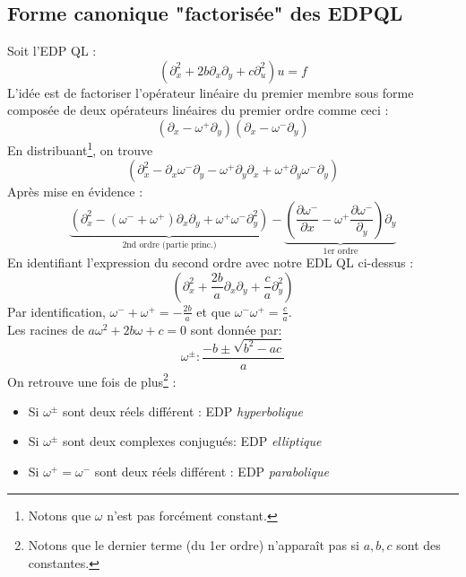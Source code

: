 \documentclass	[11pt, a4paper, openany]{book}
\begin{document}
\setcounter{subsection}{3}
\subsection{Forme canonique "factorisée" des EDPQL}
Soit l'EDP QL : 
\begin{equation}
(\partial^2_x + 2b\partial_x\partial_y + c \partial_u^2)u = f
\end{equation}
L'idée est de factoriser l'opérateur linéaire du premier membre sous forme composée de deux opérateurs linéaires du premier ordre comme ceci :
\begin{equation}
(\partial_x - \omega^+ \partial_y)(\partial_x - \omega^- \partial_y)
\end{equation}
En distribuant\footnote{Notons que $\omega$ n'est pas forcément constant.}, on trouve
\begin{equation}
(\partial_x^2 - \partial_x\omega^-\partial_y - \omega^+\partial_y\partial_x + \omega^+\partial_y\omega^-\partial_y)
\end{equation}
Après mise en évidence :
\begin{equation}
\underbrace{(\partial^2_x -(\omega^-+\omega^+)\partial_x\partial_y + \omega^+\omega^-\partial_y^2)}_{\text{2nd ordre (partie princ.)}} - \underbrace{\left(\frac{\partial \omega^-}{\partial x}-\omega^+\frac{\partial \omega^-}{\partial_y}\right)\partial_y}_{\text{1er ordre}}
\end{equation}
En identifiant l'expression du second ordre avec notre EDL QL ci-dessus :
\begin{equation}
(\partial_x^2 + \frac{2b}{a}\partial_x\partial_y + \frac{c}{a}\partial_y^2)
\end{equation}
Par identification, $\omega^-+\omega^+ = -\frac{2b}{a}$ et que $\omega^-\omega^+ = \frac{c}{a}$.\\
Les racines de $a\omega^2 +2b\omega + c = 0$ sont donnée par:
\begin{equation}
\omega^\pm : \dfrac{-b\pm \sqrt{b^2-ac}}{a}
\end{equation}
On retrouve une fois de plus\footnote{Notons que le dernier terme (du 1er ordre) n'apparaît pas si $a,b,c$ sont des constantes.} : 
\begin{itemize}
\item Si $\omega^\pm$ sont deux réels différent : EDP \textit{hyperbolique}
\item Si $\omega^\pm$ sont deux complexes conjugués: EDP \textit{elliptique}
\item Si $\omega^+=\omega^-$ sont deux réels différent : EDP \textit{parabolique}
\end{itemize}
\end{document}
